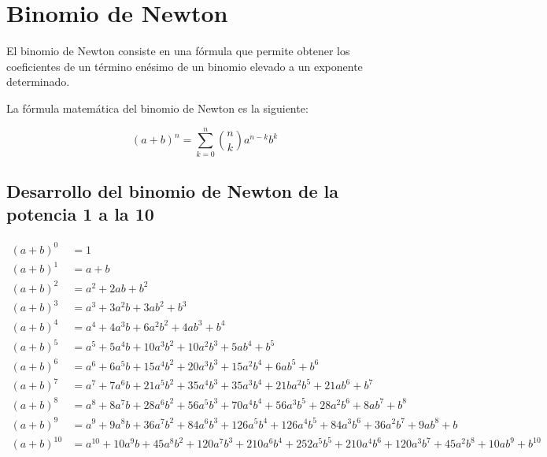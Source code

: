 
\section{Binomio de Newton}

El binomio de Newton consiste en una fórmula que permite obtener los
coeficientes de un término enésimo de un binomio elevado a un exponente
determinado.

La fórmula matemática del binomio de Newton es la siguiente:

\begin{equation}
    (a+b)^n = \sum_{k=0}^{n} \binom{n}{k} a^{n-k} b^k
\end{equation}

\subsection{Desarrollo del binomio de Newton de la potencia 1 a la 10}

\begin{landscape}
	\begin{equation}
		\begin{split}
			(a+b)^0 &   = 1 \\
			(a+b)^1 &   = a+b \\
			(a+b)^2 &   = a^2+2ab+b^2 \\
			(a+b)^3 &   = a^3+3a^2b+3ab^2+b^3 \\
			(a+b)^4 &   = a^4+4a^3b+6a^2b^2+4ab^3+b^4 \\
			(a+b)^5 &   = a^5+5a^4b+10a^3b^2+10a^2b^3+5ab^4+b^5\\
			(a+b)^6 &   = a^6+6a^5b+15a^4b^2+20a^3b^3+15a^2b^4+6ab^5+b^6\\
			(a+b)^7 &   = a^7+7a^6b+21a^5b^2+35a^4b^3+35a^3b^4+21ba^2b^5+21ab^6+b^7 \\
			(a+b)^8 &   = a^8+8a^7b+28a^6b^2+56a^5b^3+70a^4b^4+56a^3b^5+28a^2b^6+8ab^7+b^8 \\
			(a+b)^9 &   = a^9+9a^8b+36a^7b^2+84a^6b^3+126a^5b^4+126a^4b^5+84a^3b^6+36a^2b^7+9ab^8+b \\
			(a+b)^{10} &    = a^{10}+10a^9b+45a^8b^2+120a^7b^3+210a^6b^4+252a^5b^5+210a^4b^6+120a^3b^7+45a^2b^8+10ab^9+b^{10} \\
		\end{split}
	\end{equation}
\end{landscape}
